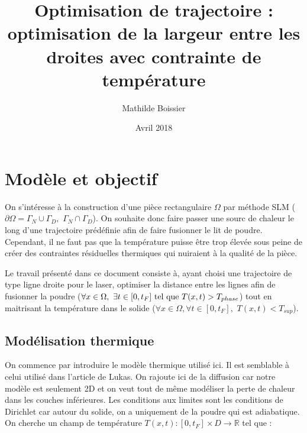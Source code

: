 \documentclass[11pt,a4paper]{article}
\begin{document}
\newcommand{\heavi}{h_{\epsilon}}
\newcommand{\heaviP}{h'_{\epsilon}}
\newcommand{\heaviPP}{h''_{\epsilon}}

\newcommand{\Math}[1]{\textcolor{red}{\textbf{#1}}}

\newcommand{\intO}{\int_{\Omega}}
\newcommand{\bigintO}{\bigint_{\Omega}}
\newcommand{\accDeuxcol}[1]{\left\{\begin{array}{ll}#1\end{array}\right.}
\newcommand{\accUnecol}[1]{\left\{\begin{array}{l}#1\end{array}\right.}

\newcommand{\stilde}{\tilde{s}}


\title{Optimisation de trajectoire : optimisation de la largeur entre les droites avec contrainte de température}
\author{Mathilde Boissier}
\date{Avril 2018}

\maketitle


\section*{Modèle et objectif}

On s'intéresse à la construction d'une pièce rectangulaire $\Omega$ par méthode SLM ($\partial\Omega=\Gamma_N\cup\Gamma_D,\,\,\Gamma_N\cap\Gamma_D$). On souhaite donc faire passer une sourc de chaleur le long d'une trajectoire prédéfinie afin de faire fusionner le lit de poudre. Cependant, il ne faut pas que la température puisse être trop élevée sous peine de créer des contraintes résiduelles thermiques qui nuiraient à la qualité de la pièce. 

\vspace{0.5cm}

Le travail présenté dans ce document consiste à, ayant choisi une trajectoire de type ligne droite pour le laser, optimiser la distance entre les lignes afin de fusionner la poudre ($\forall x\in\Omega,\,\,\exists t\in[0,t_F]\,\,\textrm{tel\,\,que}\,\,T(x,t)>T_{phase}$) tout en maitrisant la température dans le solide ($\forall x\in\Omega,\forall t\in [0,t_F],\,\,T(x,t)<T_{sup}$).

\subsection*{Modélisation thermique}
On commence par introduire le modèle thermique utilisé ici. Il est semblable à celui utilisé dans l'article de Lukas. On rajoute ici de la diffusion car notre modèle est seulement 2D et on veut tout de même modéliser la perte de chaleur dans les couches inférieures. Les conditions aux limites sont les conditions de Dirichlet car autour du solide, on a uniquement de la poudre qui est adiabatique. On cherche un champ de température $T(x,t) : [0,t_F]\times D \rightarrow \mathbb{R}$ tel que :
\end{document}
